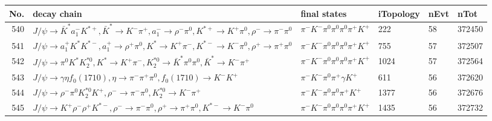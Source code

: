 \begin{table}[htbp] 
\begin{center}
\begin{small}
\begin{tabular}{rlllll}\hline\hline
 No. & decay chain & final states &  iTopology & nEvt & nTot \\\hline
540&$J/\psi       \rightarrow \bar{K}^{*}   a_{1}^{-}      K^{*+}         , \bar{K}^{*}    \rightarrow K^{-}          \pi^{+}        , a_{1}^{-}       \rightarrow \rho^{-}      \pi^{0}        , K^{*+}          \rightarrow K^{+}          \pi^{0}        , \rho^{-}       \rightarrow \pi^{-}        \pi^{0}        $&$\pi^{-}        K^{-}          \pi^{0}        \pi^{0}        \pi^{0}        \pi^{+}        K^{+}          $&  222&   58&372450\\
541&$J/\psi       \rightarrow a_{1}^{+}      K^{*}          K^{*-}         , a_{1}^{+}       \rightarrow \rho^{+}      \pi^{0}        , K^{*}           \rightarrow K^{+}          \pi^{-}        , K^{*-}          \rightarrow K^{-}          \pi^{0}        , \rho^{+}       \rightarrow \pi^{+}        \pi^{0}        $&$\pi^{-}        K^{-}          \pi^{0}        \pi^{0}        \pi^{0}        \pi^{+}        K^{+}          $&  755&   57&372507\\
542&$J/\psi       \rightarrow \pi^{0}        K^{*}          K_2^{*0}       , K^{*}           \rightarrow K^{+}          \pi^{-}        , K_2^{*0}        \rightarrow \bar{K}^{*}   \pi^{0}        \pi^{0}        , \bar{K}^{*}    \rightarrow K^{-}          \pi^{+}        $&$\pi^{-}        K^{-}          \pi^{0}        \pi^{0}        \pi^{0}        \pi^{+}        K^{+}          $& 1024&   57&372564\\
543&$J/\psi       \rightarrow \gamma       \eta          f_{0}(1710)    , \eta           \rightarrow \pi^{-}        \pi^{+}        \pi^{0}        , f_{0}(1710)     \rightarrow K^{-}          K^{+}          $&$\pi^{-}        K^{-}          \pi^{0}        \pi^{+}        \gamma       K^{+}          $&  611&   56&372620\\
544&$J/\psi       \rightarrow \rho^{-}      \pi^{0}        K_2^{*0}       K^{+}          , \rho^{-}       \rightarrow \pi^{-}        \pi^{0}        , K_2^{*0}        \rightarrow K^{-}          \pi^{+}        $&$\pi^{-}        K^{-}          \pi^{0}        \pi^{0}        \pi^{+}        K^{+}          $& 1377&   56&372676\\
545&$J/\psi       \rightarrow K^{+}          \rho^{-}      \rho^{+}      K^{*-}         , \rho^{-}       \rightarrow \pi^{-}        \pi^{0}        , \rho^{+}       \rightarrow \pi^{+}        \pi^{0}        , K^{*-}          \rightarrow K^{-}          \pi^{0}        $&$\pi^{-}        K^{-}          \pi^{0}        \pi^{0}        \pi^{0}        \pi^{+}        K^{+}          $& 1435&   56&372732\\

\end{tabular}
\end{small}
\end{center}
\end{table}
